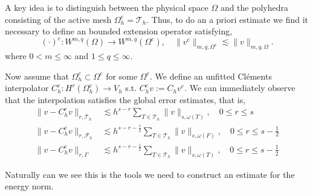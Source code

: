 A key idea is to distinguish between the physical space $\Omega $ and the polyhedra consisting of the active mesh $\Omega ^{e}_{h} = \mathcal{T}_{h}$. Thus, to do an
a priori estimate we find it necessary to define an bounded extension operator satisfying, \[
( \cdot ) ^{e}: W^{m,q}( \Omega )  \to W^{m,q} ( \Omega ^{e}), \quad \| v^{e} \|_{ m,q,\Omega ^{e}  }^{  } \lesssim \| v \|_{ m,q, \Omega  }^{  }.
\]
where $0< m \le \infty$ and $1 \le q \le \infty$.

Now assume that $\Omega _{h}^{e} \subset  \Omega^{e} $ for some $\Omega^{e}  $. We define an unfitted Cléments interpolator $C_{h}^{e}: H^{r}( \Omega ^{e}_{h}) \to V_{h}$
s.t.  $C ^{e} _{h} v := C _{h} v^{e} $.
We can immediately observe that the interpolation satisfies the global error estimates, that is,
\begin{align}
    \label{eq:bi_projection_estimates_1}
    \| v - C _{h}^{e} v \|_{  r, \mathcal{T} _{h} }^{  } & \lesssim h^{s-r}\sum_{T \in \mathcal{T}_h} \| v \|_{ s, \omega(T) }^{  }, \quad 0\le r\le s \\
    \label{eq:bi_projection_estimates_2}
\| v - C ^{e}_{h}v \|_{ r,\mathcal{F} _{h} }^{  } & \lesssim h^{s-r-\frac{1}{2}}\sum_{T \in \mathcal{T}_h} \| v \|_{ s, \omega(F)  }^{  }, \quad 0  \le  r \le   s- \frac{1}{2} \\
    \label{eq:bi_projection_estimates_3}
\| v - C ^{e}_{h}v \|_{ r, \Gamma }^{  } & \lesssim h^{s-r-\frac{1}{2}} \sum_{T \in \mathcal{T}_h}  \| v \|_{ s,  \omega(T)  }^{  }, \quad 0  \le  r \le   s- \frac{1}{2}
\end{align}


Naturally can we see this is the tools we need to construct an estimate for the energy norm.

